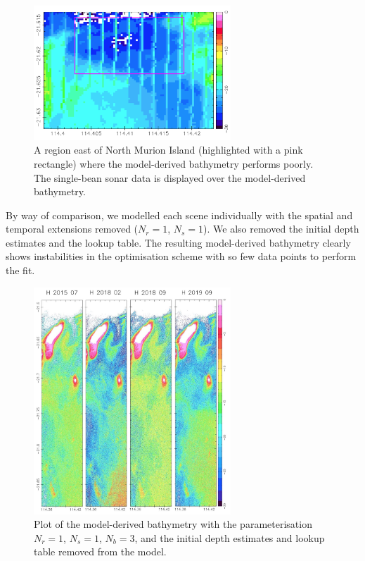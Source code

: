 \documentclass[12pt]{article}
\numberwithin{equation}{section}
\begin{document}
\begin{figure}[H]
\centering
\includegraphics[width=0.66\textwidth]{poor_bathy_area.png}
\caption{A region east of North Murion Island (highlighted with a pink rectangle) where 
the model-derived bathymetry performs poorly. The single-bean sonar data is displayed  
over the model-derived bathymetry.}
\end{figure}

By way of comparison, we modelled each scene individually with the spatial and temporal 
extensions removed ($N_r = 1$, $N_s = 1$). We also removed the initial depth estimates 
and the lookup table. The resulting model-derived bathymetry clearly shows instabilities 
in the optimisation scheme with so few data points to perform the fit. 

\begin{figure}[H]
\centering
\includegraphics[width=0.66\textwidth]{blind_singletons.jpg}
\caption{Plot of the model-derived bathymetry with the parameterisation 
$N_r = 1$, $N_s = 1$, $N_b = 3$, and the initial depth estimates and lookup 
table removed from the model.}
\end{figure}
\end{document}
